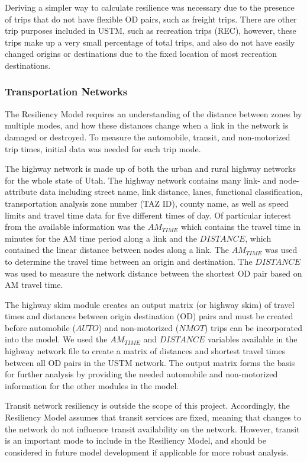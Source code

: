 \noindent Deriving a simpler way to calculate resilience was necessary due to
the presence of trips that do not have flexible OD pairs, such as freight trips.
There are other trip purposes included in USTM, such as recreation trips (REC),
however, these trips make up a very small percentage of total trips, and also
do not have easily changed origins or destinations due to the fixed location of
most recreation destinations.

\subsubsection{Transportation Networks}

The Resiliency Model requires an understanding of the distance between zones by multiple modes, and how
these distances change when a link in the network is damaged or destroyed. To measure the
automobile, transit, and non-motorized trip times, initial data was needed for each trip mode.

The highway network is made up of both the urban and rural highway networks for the whole state of Utah. The highway network contains many link- and node-attribute data including street name, link distance, lanes, functional classification, transportation analysis zone number (TAZ ID), county name, as well as speed limits and travel time data for five different times of day.  Of particular interest from the available information was the $AM_{TIME}$ which contains the travel time in minutes for the AM time period along a link and the $DISTANCE$, which contained the linear distance between nodes along a link. The $AM_{TIME}$ was used to determine the travel time between an origin and destination. The $DISTANCE$ was used to measure the network distance between the shortest OD pair based on AM travel time.

The highway skim module creates an output matrix (or highway skim) of travel times and distances between origin destination (OD) pairs and must be created before automobile ($AUTO$) and non-motorized ($NMOT$) trips can be incorporated into the model. We used the $AM_{TIME}$ and $DISTANCE$ variables available in the highway network file to create a matrix of distances and shortest travel times between all OD pairs in the USTM network. The output matrix forms the basis for further analysis by providing the needed automobile and non-motorized information for the other modules in the model.

Transit network resiliency is outside the scope of this project. Accordingly, the Resiliency
Model assumes that transit services are fixed, meaning that changes to the
network do not influence transit availability on the network. However, transit
is an important mode to include in the Resiliency Model, and  should be
considered in future model development if applicable for more robust analysis.

